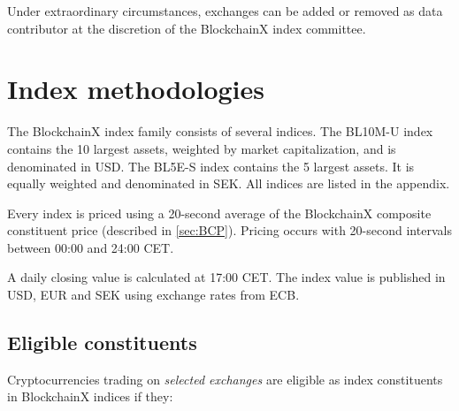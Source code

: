 \documentclass{article}
\begin{document}
Under extraordinary circumstances, exchanges can be added or removed as data contributor at the discretion of the BlockchainX index committee. 

\section{Index methodologies}

The BlockchainX index family consists of several indices. 
The BL10M-U index contains the 10 largest assets, weighted by market capitalization, and is denominated in USD. 
The BL5E-S index contains the 5 largest assets. It is equally weighted and denominated in SEK. 
All indices are listed in the appendix.

Every index is priced using a 20-second average of the BlockchainX composite constituent price (described in \ref{sec:BCP}). Pricing occurs with 20-second intervals between 00:00 and 24:00 CET.

A daily closing value is calculated at 17:00 CET. 
The index value is published in USD, EUR and SEK using exchange rates from ECB. 


\subsection{Eligible constituents} \label{sec:eligible-const}
Cryptocurrencies trading on \textit{selected exchanges} are eligible as index constituents in BlockchainX indices if they:
\end{document}
